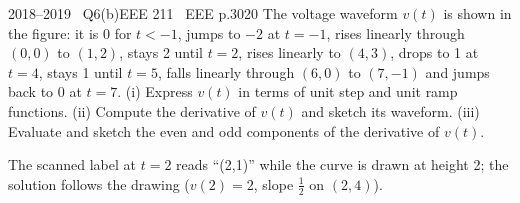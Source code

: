 \begin{qcard}{2018--2019 \textbullet\ Q6(b)}{EEE 211 \textbullet\ EEE p.30}{20}
The voltage waveform $v(t)$ is shown in the figure: it is 0 for $t<-1$, jumps to $-2$ at $t=-1$, rises linearly through $(0,0)$ to $(1,2)$, stays 2 until $t=2$, rises linearly to $(4,3)$, drops to 1 at $t=4$, stays 1 until $t=5$, falls linearly through $(6,0)$ to $(7,-1)$ and jumps back to 0 at $t=7$.
(i) Express $v(t)$ in terms of unit step and unit ramp functions. (ii) Compute the derivative of $v(t)$ and sketch its waveform. (iii) Evaluate and sketch the even and odd components of the derivative of $v(t)$.
\end{qcard}
\begin{notebox}The scanned label at $t=2$ reads ``(2,1)'' while the curve is drawn at height 2; the solution follows the drawing ($v(2)=2$, slope $\frac12$ on $(2,4)$).\end{notebox}
